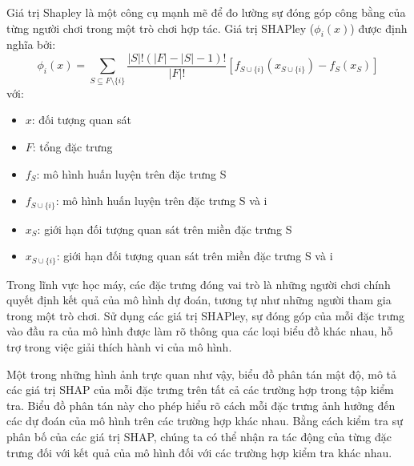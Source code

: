 Giá trị Shapley là một công cụ mạnh mẽ để đo lường sự đóng góp công bằng của từng người chơi trong một trò chơi hợp tác\cite{shap_value}. Giá trị SHAPley ($\phi_i(x)$) được định nghĩa bởi: 
\begin{equation}
  \phi _i (x) = \sum _{S \subseteq F \setminus \{i\}} \frac{|S|!(|F|-|S|-1)!}{|F|!}[f_{S \cup \{i\}}(x_{S \cup \{i\}})-f_{S }(x_{S })]
\end{equation}  
với:
 \begin{itemize}
   \item $x$: đối tượng quan sát 
   \item $F$: tổng đặc trưng
   \item $f_S$: mô hình huấn luyện trên đặc trưng S
   
   \item $f_{S \cup \{i\}}$: mô hình huấn luyện trên đặc trưng S và i
  \item $x_S$: giới hạn đối tượng quan sát trên miền đặc trưng S
  \item $x_{S \cup \{i\}}$: giới hạn đối tượng quan sát trên miền đặc trưng S và i
 \end{itemize}

Trong lĩnh vực học máy, các đặc trưng đóng vai trò là những người chơi chính quyết định kết quả của mô hình dự đoán, tương tự như những người tham gia trong một trò chơi. Sử dụng các giá trị SHAPley, sự đóng góp của mỗi đặc trưng vào đầu ra của mô hình được làm rõ thông qua các loại biểu đồ khác nhau, hỗ trợ trong việc giải thích hành vi của mô hình.

Một trong những hình ảnh trực quan như vậy, biểu đồ phân tán mật độ, mô tả các giá trị SHAP của mỗi đặc trưng trên tất cả các trường hợp trong tập kiểm tra. Biểu đồ phân tán này cho phép hiểu rõ cách mỗi đặc trưng ảnh hưởng đến các dự đoán của mô hình trên các trường hợp khác nhau. Bằng cách kiểm tra sự phân bố của các giá trị SHAP, chúng ta có thể nhận ra tác động của từng đặc trưng đối với kết quả của mô hình đối với các trường hợp kiểm tra khác nhau.

